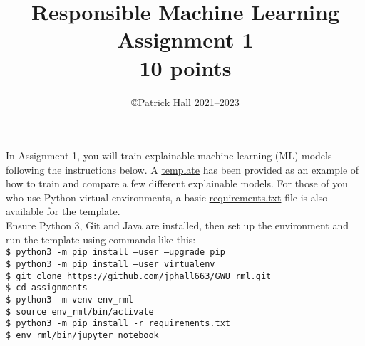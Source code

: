 \documentclass[fleqn]{article}
\title{Responsible Machine Learning\\\Large{Assignment 1}\\\Large{10 points}}
\author{\copyright Patrick Hall 2021--2023}
\begin{document}
\maketitle

\noindent In Assignment 1, you will train explainable machine learning (ML) models following the instructions below. A \href{https://nbviewer.jupyter.org/github/jphall663/GWU_rml/blob/master/assignments/assignment_1/assign_1_template.ipynb?flush_cache=true}{template} has been provided as an example of how to train and compare a few different explainable models. For those of you who use Python virtual environments, a basic \href{https://github.com/jphall663/GWU_rml/blob/master/assignments/requirements.txt}{requirements.txt} file is also available for the template.\\

\noindent Ensure Python 3, Git and Java are installed, then set up the environment and run the template using commands like this:\\ 
\noindent \texttt{\$ python3 -m pip install --user --upgrade pip}\\
\noindent \texttt{\$ python3 -m pip install --user virtualenv}\\
\noindent \texttt{\$ git clone https://github.com/jphall663/GWU\_rml.git}\\
\noindent \texttt{\$ cd assignments}\\
\noindent \texttt{\$ python3 -m venv env\_rml}\\
\noindent \texttt{\$ source env\_rml/bin/activate}\\
\noindent \texttt{\$ python3 -m pip install -r requirements.txt}\\
\noindent \texttt{\$ env\_rml/bin/jupyter notebook}\\
\end{document}
